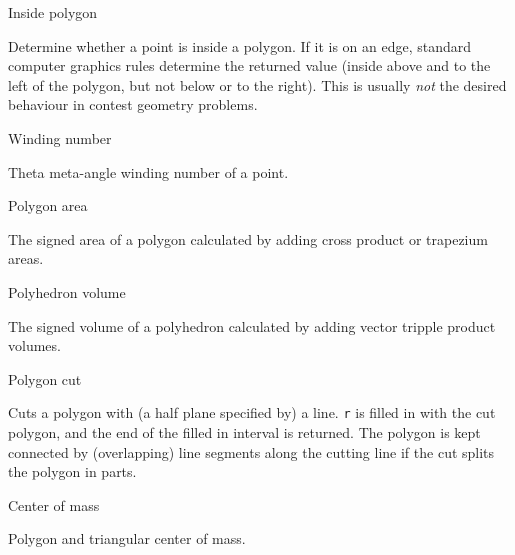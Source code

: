 \begin{algorithm}{Inside polygon}

Determine whether a point is inside a polygon. If it is on an edge,
standard computer graphics rules determine the returned value (inside above
and to the left of the polygon, but not below or to the right).
This is usually \emph{not} the desired behaviour in contest geometry problems.
\end{algorithm}

\begin{algorithm}{Winding number}

Theta meta-angle winding number of a point.
\end{algorithm}

\begin{algorithm}{Polygon area}

The signed area of a polygon calculated by adding cross product or
trapezium areas.
\end{algorithm}

\begin{algorithm}{Polyhedron volume}

The signed volume of a polyhedron calculated by adding vector tripple
product volumes.
\end{algorithm}

\begin{algorithm}{Polygon cut}

Cuts a polygon with (a half plane specified by) a line.
{\tt r} is filled in with the cut polygon, and the end of the filled in
interval is returned. The polygon is kept connected by (overlapping)
line segments along the cutting line if the cut splits the polygon in parts.
\end{algorithm}


\begin{algorithm}{Center of mass}

Polygon and triangular center of mass.
\end{algorithm}
